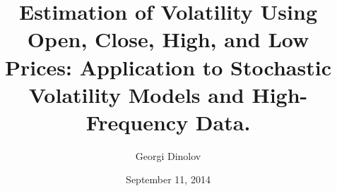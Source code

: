 \documentclass{beamer}
\title{Estimation of Volatility Using Open, Close, High, and Low Prices: Application to Stochastic 
Volatility Models and High-Frequency Data.}
\institute{Applied Mathematics and Statistics, \\ University of California, Santa Cruz}
\author{Georgi Dinolov}
\date{September 11, 2014}
\begin{document}

\begin{frame}
  \titlepage
\end{frame}




%
%	
%
%
%
%
%
\end{document}
